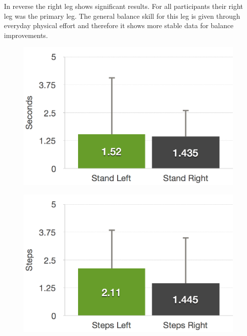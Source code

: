In reverse the right leg shows significant results.
For all participants their right leg was the primary leg.
The general balance skill for this leg is given through everyday physical effort and therefore it shows more stable data for balance improvements.

\begin{figure}[htb]
	\centering
	\begin{minipage}[t]{0.32\linewidth}
		\centering
		\includegraphics[width=1\linewidth]{Pictures/6_4_DIA_StandAllDiff}
		\label{fig:6_4_standAllDiff}
	\end{minipage}
	\hfill
	\begin{minipage}[t]{0.32\linewidth}
		\centering
		\includegraphics[width=1\linewidth]{Pictures/6_4_DIA_StepsAllDiff}
		\label{fig:6_4_stepsAllDiff}
	\end{minipage}

\end{figure}
